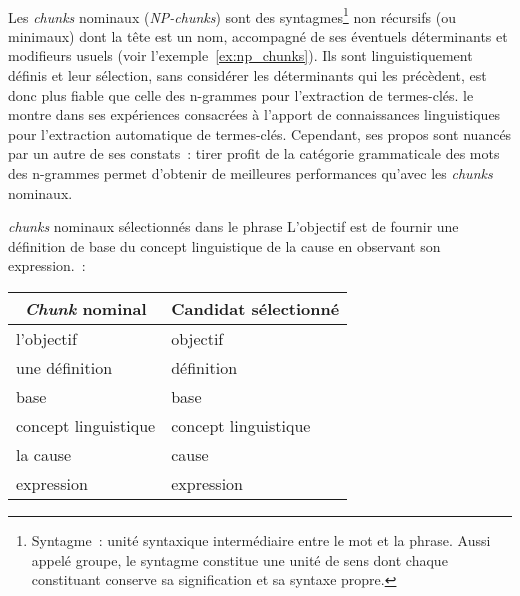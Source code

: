     ~\\Les \textit{chunks} nominaux
    (\textit{NP-chunks}) sont des syntagmes\footnote{Syntagme~: unité syntaxique
    intermédiaire entre le mot et la phrase. Aussi appelé groupe, le syntagme
    constitue une unité de sens dont chaque constituant conserve sa
    signification et sa syntaxe propre.} non récursifs (ou minimaux) dont la
    tête est un nom, accompagné de ses éventuels déterminants et modifieurs
    usuels (voir l'exemple~\ref{ex:np_chunks}). Ils sont linguistiquement
    définis et leur sélection, sans considérer les déterminants qui les précèdent, est
    donc plus fiable que celle des n-grammes pour l'extraction de termes-clés.
     le montre dans ses expériences
    consacrées à l'apport de connaissances linguistiques pour l'extraction
    automatique de termes-clés. Cependant, ses propos sont nuancés par un autre
    de ses constats~: tirer profit de la catégorie grammaticale des mots des
    n-grammes permet d'obtenir de meilleures performances qu'avec les
    \textit{chunks} nominaux.

    \begin{example}\label{ex:np_chunks}
      \textit{chunks} nominaux sélectionnés dans le phrase \og{}L'objectif est
      de fournir une définition de base du concept linguistique de la cause en
      observant son expression.\fg{}~:
      \begin{center}
        \begin{tabular}{l|l}
          \toprule
          \multicolumn{1}{c|}{\textbf{\textit{Chunk} nominal}} & \multicolumn{1}{c}{\textbf{Candidat sélectionné}}\\
          \hline
          \og{}l'objectif\fg{} & \og{}objectif\fg{}\\
          \og{}une définition\fg{} & \og{}définition\fg{}\\
          \og{}base\fg{} & \og{}base\fg{}\\
          \og{}concept linguistique\fg{} & \og{}concept linguistique\fg{}\\
          \og{}la cause\fg{} & \og{}cause\\
          \og{}expression\fg{} & \og{}expression\fg{}\\
          \bottomrule
        \end{tabular}
      \end{center}\vspace{.25em}
    \end{example}

